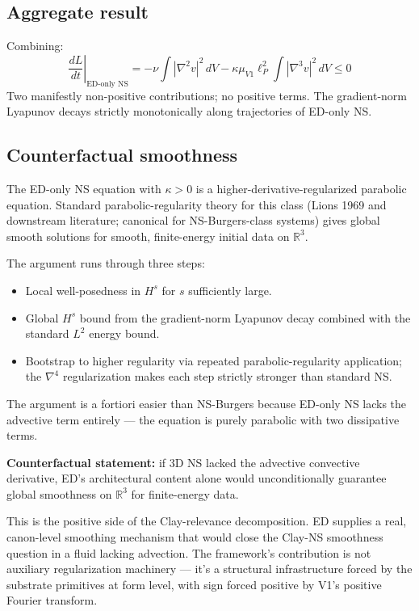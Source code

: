 \documentclass[11pt,a4paper]{article}
\begin{document}
\subsection{Aggregate result}

Combining:
\[
\left.\frac{dL}{dt}\right|_{\text{ED-only NS}} = -\nu\int|\nabla^2 v|^2\, dV - \kappa\mu_{V1}\ell_P^2\int|\nabla^3 v|^2\, dV \leq 0
\]
Two manifestly non-positive contributions; no positive terms. The gradient-norm Lyapunov decays strictly monotonically along trajectories of ED-only NS.

\subsection{Counterfactual smoothness}

The ED-only NS equation with $\kappa > 0$ is a higher-derivative-regularized parabolic equation. Standard parabolic-regularity theory for this class (Lions 1969 and downstream literature; canonical for NS-Burgers-class systems) gives global smooth solutions for smooth, finite-energy initial data on $\mathbb{R}^3$.

The argument runs through three steps:

\begin{itemize}[noitemsep]
  \item Local well-posedness in $H^s$ for $s$ sufficiently large.
  \item Global $H^s$ bound from the gradient-norm Lyapunov decay combined with the standard $L^2$ energy bound.
  \item Bootstrap to higher regularity via repeated parabolic-regularity application; the $\nabla^4$ regularization makes each step strictly stronger than standard NS.
\end{itemize}

The argument is a fortiori easier than NS-Burgers because ED-only NS lacks the advective term entirely --- the equation is purely parabolic with two dissipative terms.

\textbf{Counterfactual statement:} if 3D NS lacked the advective convective derivative, ED's architectural content alone would unconditionally guarantee global smoothness on $\mathbb{R}^3$ for finite-energy data.

This is the positive side of the Clay-relevance decomposition. ED supplies a real, canon-level smoothing mechanism that would close the Clay-NS smoothness question in a fluid lacking advection. The framework's contribution is not auxiliary regularization machinery --- it's a structural infrastructure forced by the substrate primitives at form level, with sign forced positive by V1's positive Fourier transform.
\end{document}
